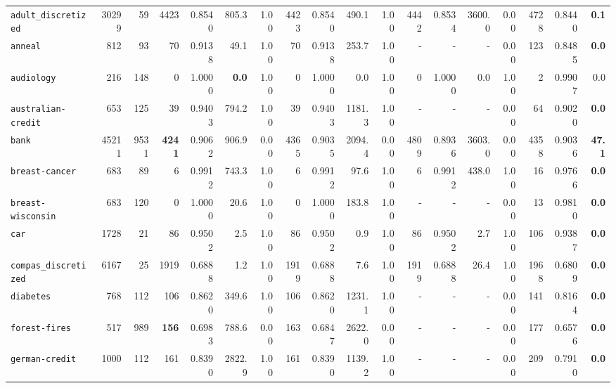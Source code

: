 \begin{tabular}{lccrrrrrrrrrrrrrrr}
\texttt{adult\_discretized} & \multicolumn{1}{r}{30299} & \multicolumn{1}{r}{59}  & 4423 & 0.8540 & 805.3 & 1.00 & 4423 & 0.8540 & 490.1 & 1.00 & 4442 & 0.8534 & 3600.0 & 0.00 & 4728 & 0.8440 & \textbf{0.1}\\
\texttt{anneal} & \multicolumn{1}{r}{812} & \multicolumn{1}{r}{93}  & 70 & 0.9138 & 49.1 & 1.00 & 70 & 0.9138 & 253.7 & 1.00 & - & - & - & 0.00 & 123 & 0.8485 & \textbf{0.0}\\
\texttt{audiology} & \multicolumn{1}{r}{216} & \multicolumn{1}{r}{148}  & 0 & 1.0000 & \textbf{0.0} & 1.00 & 0 & 1.0000 & 0.0 & 1.00 & 0 & 1.0000 & 0.0 & 1.00 & 2 & 0.9907 & 0.0\\
\texttt{australian-credit} & \multicolumn{1}{r}{653} & \multicolumn{1}{r}{125}  & 39 & 0.9403 & 794.2 & 1.00 & 39 & 0.9403 & 1181.3 & 1.00 & - & - & - & 0.00 & 64 & 0.9020 & \textbf{0.0}\\
\texttt{bank} & \multicolumn{1}{r}{45211} & \multicolumn{1}{r}{9531}  & \textbf{4241} & 0.9062 & 906.9 & 0.00 & 4365 & 0.9035 & 2094.4 & 0.00 & 4809 & 0.8936 & 3603.0 & 0.00 & 4358 & 0.9036 & \textbf{47.1}\\
\texttt{breast-cancer} & \multicolumn{1}{r}{683} & \multicolumn{1}{r}{89}  & 6 & 0.9912 & 743.3 & 1.00 & 6 & 0.9912 & 97.6 & 1.00 & 6 & 0.9912 & 438.0 & 1.00 & 16 & 0.9766 & \textbf{0.0}\\
\texttt{breast-wisconsin} & \multicolumn{1}{r}{683} & \multicolumn{1}{r}{120}  & 0 & 1.0000 & 20.6 & 1.00 & 0 & 1.0000 & 183.8 & 1.00 & - & - & - & 0.00 & 13 & 0.9810 & \textbf{0.0}\\
\texttt{car} & \multicolumn{1}{r}{1728} & \multicolumn{1}{r}{21}  & 86 & 0.9502 & 2.5 & 1.00 & 86 & 0.9502 & 0.9 & 1.00 & 86 & 0.9502 & 2.7 & 1.00 & 106 & 0.9387 & \textbf{0.0}\\
\texttt{compas\_discretized} & \multicolumn{1}{r}{6167} & \multicolumn{1}{r}{25}  & 1919 & 0.6888 & 1.2 & 1.00 & 1919 & 0.6888 & 7.6 & 1.00 & 1919 & 0.6888 & 26.4 & 1.00 & 1968 & 0.6809 & \textbf{0.0}\\
\texttt{diabetes} & \multicolumn{1}{r}{768} & \multicolumn{1}{r}{112}  & 106 & 0.8620 & 349.6 & 1.00 & 106 & 0.8620 & 1231.1 & 1.00 & - & - & - & 0.00 & 141 & 0.8164 & \textbf{0.0}\\
\texttt{forest-fires} & \multicolumn{1}{r}{517} & \multicolumn{1}{r}{989}  & \textbf{156} & 0.6983 & 788.6 & 0.00 & 163 & 0.6847 & 2622.0 & 0.00 & - & - & - & 0.00 & 177 & 0.6576 & \textbf{0.0}\\
\texttt{german-credit} & \multicolumn{1}{r}{1000} & \multicolumn{1}{r}{112}  & 161 & 0.8390 & 2822.9 & 1.00 & 161 & 0.8390 & 1139.2 & 1.00 & - & - & - & 0.00 & 209 & 0.7910 & \textbf{0.0}\\

\end{tabular}
